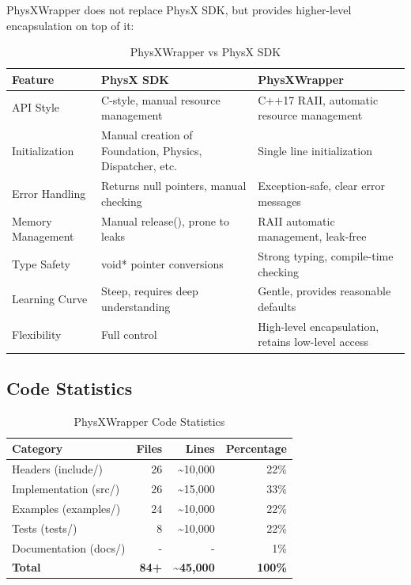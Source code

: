 PhysXWrapper does not replace PhysX SDK, but provides higher-level encapsulation on top of it:

\begin{table}[h]
\centering
\caption{PhysXWrapper vs PhysX SDK}
\begin{tabular}{|l|p{5cm}|p{5cm}|}
\hline
\textbf{Feature} & \textbf{PhysX SDK} & \textbf{PhysXWrapper} \\
\hline
\hline
API Style & C-style, manual resource management & C++17 RAII, automatic resource management \\
\hline
Initialization & Manual creation of Foundation, Physics, Dispatcher, etc. & Single line initialization \\
\hline
Error Handling & Returns null pointers, manual checking & Exception-safe, clear error messages \\
\hline
Memory Management & Manual release(), prone to leaks & RAII automatic management, leak-free \\
\hline
Type Safety & void* pointer conversions & Strong typing, compile-time checking \\
\hline
Learning Curve & Steep, requires deep understanding & Gentle, provides reasonable defaults \\
\hline
Flexibility & Full control & High-level encapsulation, retains low-level access \\
\hline
\end{tabular}
\end{table}

\subsection{Code Statistics}

\begin{table}[h]
\centering
\caption{PhysXWrapper Code Statistics}
\begin{tabular}{|l|r|r|r|}
\hline
\textbf{Category} & \textbf{Files} & \textbf{Lines} & \textbf{Percentage} \\
\hline
\hline
Headers (include/) & 26 & \textasciitilde10,000 & 22\% \\
Implementation (src/) & 26 & \textasciitilde15,000 & 33\% \\
Examples (examples/) & 24 & \textasciitilde10,000 & 22\% \\
Tests (tests/) & 8 & \textasciitilde10,000 & 22\% \\
Documentation (docs/) & - & - & 1\% \\
\hline
\textbf{Total} & \textbf{84+} & \textbf{\textasciitilde45,000} & \textbf{100\%} \\
\hline
\end{tabular}
\end{table}

